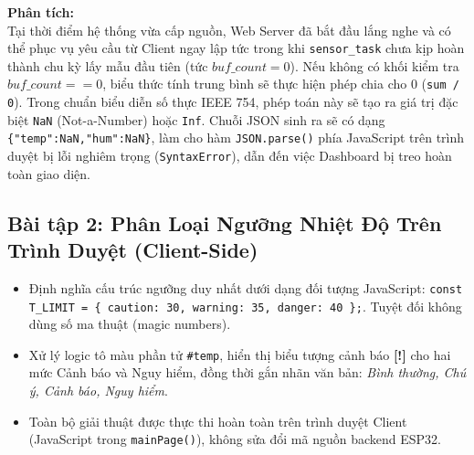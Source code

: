 \begin{tcolorbox}[colback=blue!5,colframe=blue!75!black,title=\textbf{Câu hỏi lý thuyết 2: Vì sao getAverage() bắt buộc phải xử lý trường hợp buf\_count == 0?}]
\textbf{Phân tích:} \\
Tại thời điểm hệ thống vừa cấp nguồn, Web Server đã bắt đầu lắng nghe và có thể phục vụ yêu cầu từ Client ngay lập tức trong khi \texttt{sensor\_task} chưa kịp hoàn thành chu kỳ lấy mẫu đầu tiên (tức $buf\_count = 0$). Nếu không có khối kiểm tra $buf\_count == 0$, biểu thức tính trung bình sẽ thực hiện phép chia cho 0 (\texttt{sum / 0}). Trong chuẩn biểu diễn số thực IEEE 754, phép toán này sẽ tạo ra giá trị đặc biệt \texttt{NaN} (Not-a-Number) hoặc \texttt{Inf}. Chuỗi JSON sinh ra sẽ có dạng \texttt{\{"temp":NaN,"hum":NaN\}}, làm cho hàm \texttt{JSON.parse()} phía JavaScript trên trình duyệt bị lỗi nghiêm trọng (\texttt{SyntaxError}), dẫn đến việc Dashboard bị treo hoàn toàn giao diện.
\end{tcolorbox}

\newpage
\subsection{Bài tập 2: Phân Loại Ngưỡng Nhiệt Độ Trên Trình Duyệt (Client-Side)}

\begin{tcolorbox}[
    enhanced, colback=black!2, colframe=black!60, boxrule=1pt, arc=2.5mm, drop shadow,
    attach boxed title to top left={xshift=4mm, yshift=-3mm},
    boxed title style={enhanced, colback=black!85, colframe=black!85, boxrule=1pt, arc=2.5mm, drop shadow, left=6pt, right=6pt, top=2pt, bottom=2pt},
    title=\textcolor{white}{\large\textbf{Yêu cầu kỹ thuật Bài tập 2}}
]
\bfseries
\vspace{0.2cm}
\begin{itemize}
    \item Định nghĩa cấu trúc ngưỡng duy nhất dưới dạng đối tượng JavaScript: \texttt{const T\_LIMIT = \{ caution: 30, warning: 35, danger: 40 \};}. Tuyệt đối không dùng số ma thuật (magic numbers).
    \item Xử lý logic tô màu phần tử \texttt{\#temp}, hiển thị biểu tượng cảnh báo \textbf{[!]} cho hai mức Cảnh báo và Nguy hiểm, đồng thời gắn nhãn văn bản: \textit{Bình thường, Chú ý, Cảnh báo, Nguy hiểm}.
    \item Toàn bộ giải thuật được thực thi hoàn toàn trên trình duyệt Client (JavaScript trong \texttt{mainPage()}), không sửa đổi mã nguồn backend ESP32.
\end{itemize}
\end{tcolorbox}

